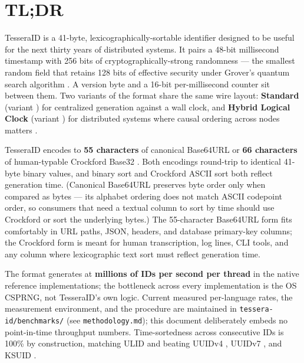 \section*{TL;DR}

\textsf{TesseraID} is a 41-byte, lexicographically-sortable identifier designed to be useful for the next thirty years of distributed systems. It pairs a 48-bit millisecond timestamp with 256 bits of cryptographically-strong randomness --- the smallest random field that retains 128 bits of effective security under Grover's quantum search algorithm \citep{grover1996}. A version byte and a 16-bit per-millisecond counter sit between them. Two variants of the format share the same wire layout: \textbf{Standard} (variant ) for centralized generation against a wall clock, and \textbf{Hybrid Logical Clock} (variant ) for distributed systems where causal ordering across nodes matters \citep{kulkarni2014hlc}.

TesseraID encodes to \textbf{55 characters} of canonical Base64URL \citep{rfc4648} or \textbf{66 characters} of human-typable Crockford Base32 \citep{crockford}. Both encodings round-trip to identical 41-byte binary values, and binary sort and Crockford ASCII sort both reflect generation time. (Canonical Base64URL preserves byte order only when compared as bytes --- its alphabet ordering does not match ASCII codepoint order, so consumers that need a textual column to sort by time should use Crockford or sort the underlying bytes.) The 55-character Base64URL form fits comfortably in URL paths, JSON, headers, and database primary-key columns; the Crockford form is meant for human transcription, log lines, CLI tools, and any column where lexicographic text sort must reflect generation time.

The format generates at \textbf{millions of IDs per second per thread} in the native reference implementations; the bottleneck across every implementation is the OS CSPRNG, not TesseraID's own logic. Current measured per-language rates, the measurement environment, and the procedure are maintained in \texttt{tessera-id/benchmarks/} (see \texttt{methodology.md}); this document deliberately embeds no point-in-time throughput numbers. Time-sortedness across consecutive IDs is 100\% by construction, matching ULID \citep{ulid} and beating UUIDv4 \citep{rfc4122}, UUIDv7 \citep{rfc9562}, and KSUID \citep{ksuid}.

